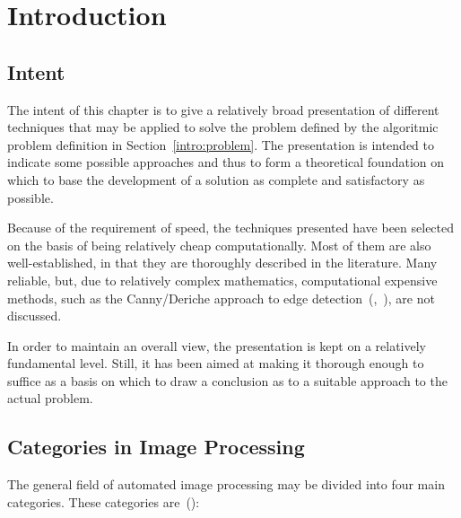 
\section{Introduction}
\label{image:intro}

\subsection{Intent}
\label{image:intro:intent}

The intent of this chapter is to give a relatively broad presentation
of different techniques that may be applied to solve the problem
defined by the algoritmic problem definition in
Section~\ref{intro:problem}.  The presentation is intended to indicate
some possible approaches and thus to form a theoretical foundation on
which to base the development of a solution as complete and
satisfactory as possible.

Because of the requirement of speed, the techniques presented have
been selected on the basis of being relatively cheap computationally.
Most of them are also well-established, in that they are thoroughly
described in the literature.  Many reliable, but, due to relatively
complex mathematics, computational expensive methods, such as the
Canny/Deriche approach to edge
detection~(\cite{canny},~\cite{deriche}), are not discussed.

In order to maintain an overall view, the presentation is kept on a
relatively fundamental level.  Still, it has been aimed at making it
thorough enough to suffice as a basis on which to draw a conclusion
as to a suitable approach to the actual problem.

\subsection{Categories in Image Processing}
\label{image:intro:categories}

The general field of automated image processing may be divided into
four main categories.  These categories are~(\cite{digim}):

